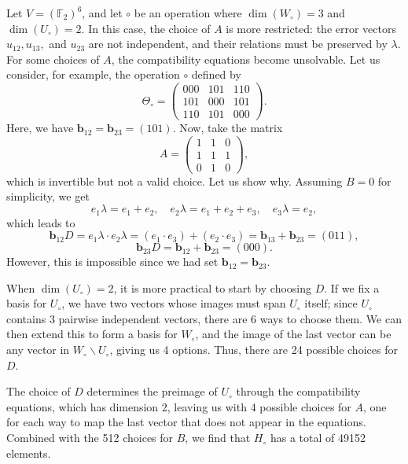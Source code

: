 \documentclass[runningheads,a4paper,english]{llncs}
\newcommand{\F}{\mathbb{F}}
\newcommand{\lb}{\lambda}
\renewcommand{\b}{\textbf{b}}
\newcommand{\wo}{W_\circ}
\newcommand{\uo}{U_\circ}
\newcommand{\ho}{H_\circ}
\begin{document}
\begin{example}
\label{ex:n6_d3_u2}
Let $V = (\F_2)^6$, and let $\circ$ be an operation where $\dim(\wo) = 3$ and $\dim(\uo) = 2$. In this case, the choice of $A$ is more restricted: the error vectors $u_{12}, u_{13},$ and $u_{23}$ are not independent, and their relations must be preserved by $\lb$. For some choices of $A$, the compatibility equations become unsolvable. Let us consider, for example, the operation $\circ$ defined by
\[
\Theta_\circ =
\begin{pmatrix}
000 & 101 & 110 \\
101 & 000 & 101 \\
110 & 101 & 000
\end{pmatrix}.
\]
Here, we have $\b_{12} = \b_{23} = (101)$. Now, take the matrix
\begin{equation*}
A =
\begin{pmatrix}
1 & 1 & 0 \\
1 & 1 & 1 \\
0 & 1 & 0
\end{pmatrix},
\end{equation*}
which is invertible but not a valid choice. Let us show why. Assuming $B = 0$ for simplicity, we get
\[
e_1 \lb = e_1 + e_2, \quad e_2 \lb = e_1 + e_2 + e_3, \quad e_3 \lb = e_2,
\]
which leads to
\[
\b_{12}D = e_1\lb \cdot e_2\lb = (e_1 \cdot e_3) + (e_2 \cdot e_3) = \b_{13} + \b_{23} = (011),
\]
\[
\b_{23}D = \b_{12} + \b_{23} = (000).
\]
However, this is impossible since we had set $\b_{12} = \b_{23}$.

When $\dim(\uo) = 2$, it is more practical to start by choosing $D$. If we fix a basis for $\uo$, we have two vectors whose images must span $\uo$ itself; since $\uo$ contains 3 pairwise independent vectors, there are 6 ways to choose them. We can then extend this to form a basis for $\wo$, and the image of the last vector can be any vector in $\wo \backslash \uo$, giving us 4 options. Thus, there are 24 possible choices for $D$.

The choice of $D$ determines the preimage of $\uo$ through the compatibility equations, which has dimension 2, leaving us with 4 possible choices for $A$, one for each way to map the last vector that does not appear in the equations. Combined with the 512 choices for $B$, we find that $\ho$ has a total of 49152 elements.


\end{example}
\end{document}

